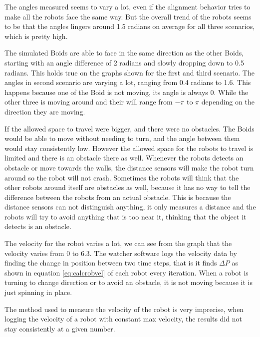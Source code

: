 
The angles measured seems to vary a lot, even if the alignment behavior tries to make all the robots face the same way. But the overall trend of the robots seems to be that the angles lingers around 1.5 radians on average for all three scenarios, which is pretty high.

The simulated Boids are able to face in the same direction as the other Boids, starting with an angle difference of 2 radians and slowly dropping down to 0.5 radians. This holds true on the graphs shown for the first and third scenario. The angles in second scenario are varying a lot, ranging from 0.4 radians to 1.6. This happens because one of the Boid is not moving, its angle is always 0. While the other three is moving around and their will range from $-\pi$ to $\pi$ depending on the direction they are moving.

If the allowed space to travel were bigger, and there were no obstacles. The Boids would be able to move without needing to turn, and the angle between them would stay consistently low. However the allowed space for the robots to travel is limited and there is an obstacle there as well.
Whenever the robots detects an obstacle or move towards the walls, the distance sensors will make the robot turn around so the robot will not crash. Sometimes the robots will think that the other robots around itself are obstacles as well, because it has no way to tell the difference between the robots from an actual obstacle. This is because the distance sensors can not distinguish anything, it only measures a distance and the robots will try to avoid anything that is too near it, thinking that the object it detects is an obstacle.

The velocity for the robot varies a lot, we can see from the graph that the velocity varies from 0 to 6.3. The watcher software logs the velocity data by finding the change in position between two time steps, that is it finds $\Delta P$ as shown in equation \ref{eq:calcrobvel} of each robot every iteration. When a robot is turning to change direction or to avoid an obstacle, it is not moving because it is just spinning in place. 

The method used to measure the velocity of the robot is very imprecise, when logging the velocity of a robot with constant max velocity, the results did not stay consistently at a given number. 

